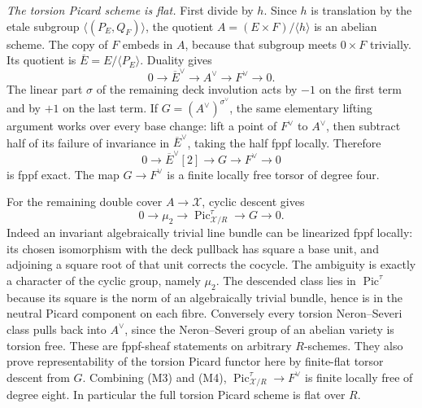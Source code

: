 \emph{The torsion Picard scheme is flat.}
First divide by $h$. Since $h$ is translation by the etale subgroup
$\langle(P_E,Q_F)\rangle$, the quotient
$A=(E\times F)/\langle h\rangle$ is an abelian scheme.
The copy of $F$ embeds in $A$, because that subgroup meets
$0\times F$ trivially. Its quotient is $\overline E=E/\langle P_E\rangle$.
Duality gives
\[
 0\longrightarrow\overline E^{\vee}\longrightarrow A^{\vee}
 \longrightarrow F^{\vee}\longrightarrow0.              \tag{M2}
\]
The linear part $\sigma$ of the remaining deck involution acts by
$-1$ on the first term and by $+1$ on the last term. If
$G=(A^{\vee})^{\sigma^{\vee}}$, the same elementary lifting argument
works over every base change: lift a point of $F^{\vee}$ to $A^{\vee}$,
then subtract half of its failure of invariance in
$\overline E^{\vee}$, taking the half fppf locally. Therefore
\[
 0\longrightarrow\overline E^{\vee}[2]\longrightarrow G
 \longrightarrow F^{\vee}\longrightarrow0               \tag{M3}
\]
is fppf exact. The map $G\to F^{\vee}$ is a finite locally free
torsor of degree four.

For the remaining double cover $A\to\mathcal X$, cyclic descent
gives
\[
 0\longrightarrow\mu_2\longrightarrow
 \operatorname{Pic}^{\tau}_{\mathcal X/R}
 \longrightarrow G\longrightarrow0.                    \tag{M4}
\]
Indeed an invariant algebraically trivial line bundle can be
linearized fppf locally: its chosen isomorphism with the deck
pullback has square a base unit, and adjoining a square root of
that unit corrects the cocycle. The ambiguity is exactly a
character of the cyclic group, namely $\mu_2$. The descended
class lies in $\operatorname{Pic}^{\tau}$ because its square is
the norm of an algebraically trivial bundle, hence is in the
neutral Picard component on each fibre. Conversely every torsion
Neron--Severi class pulls back into $A^{\vee}$, since the
Neron--Severi group of an abelian variety is torsion free.
These are fppf-sheaf statements on arbitrary $R$-schemes.
They also prove representability of the torsion Picard functor
here by finite-flat torsor descent from $G$.
Combining (M3) and (M4),
$\operatorname{Pic}^{\tau}_{\mathcal X/R}\to F^{\vee}$
is finite locally free of degree eight. In particular the full
torsion Picard scheme is flat over $R$.

